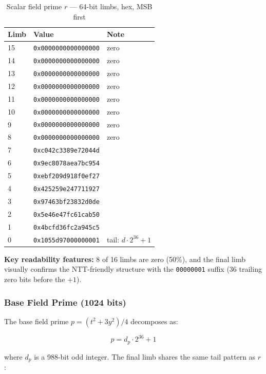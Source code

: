 \begin{table}[t]
\centering
\caption{Scalar field prime \(r\) --- 64-bit limbs, hex, MSB first}
\begin{tabular}{lll}
\toprule
Limb & Value & Note \\
\midrule
15 & \texttt{0x0000000000000000} & zero \\
14 & \texttt{0x0000000000000000} & zero \\
13 & \texttt{0x0000000000000000} & zero \\
12 & \texttt{0x0000000000000000} & zero \\
11 & \texttt{0x0000000000000000} & zero \\
10 & \texttt{0x0000000000000000} & zero \\
9 & \texttt{0x0000000000000000} & zero \\
8 & \texttt{0x0000000000000000} & zero \\
7 & \texttt{0xc042c3389e72044d} &  \\
6 & \texttt{0x9ec8078aea7bc954} &  \\
5 & \texttt{0xebf209d918f0ef27} &  \\
4 & \texttt{0x425259e247711927} &  \\
3 & \texttt{0x97463bf23832d0de} &  \\
2 & \texttt{0x5e46e47fc61cab50} &  \\
1 & \texttt{0x4bcfd36fc2a945c5} &  \\
0 & \texttt{0x1055d97000000001} & tail: \(d \cdot 2^{36} + 1\) \\
\bottomrule
\end{tabular}
\end{table}

\textbf{Key readability features:} 8 of 16 limbs are zero (50\%), and
the final limb visually confirms the NTT-friendly structure with the
\texttt{00000001} suffix (36 trailing zero bits before the \(+1\)).

\subsubsection{Base Field Prime (1024
bits)}\label{base-field-prime-1024-bits}

The base field prime \(p = (t^2 + 3y^2)/4\) decomposes as:

\[p = d_p \cdot 2^{36} + 1\]

where \(d_p\) is a 988-bit odd integer. The final limb shares the same
tail pattern as \(r\):

